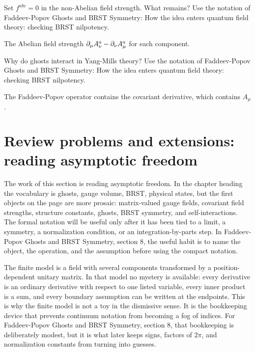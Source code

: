 \begin{exercise}
Set \(f^{abc}=0\) in the non-Abelian field strength.  What remains?  Use the notation of Faddeev-Popov Ghosts and BRST Symmetry: How the idea enters quantum field theory: checking BRST nilpotency.
\begin{answer}
The Abelian field strength \(\partial_\mu A_\nu^a-\partial_\nu A_\mu^a\) for each component.
\end{answer}
\end{exercise}

\begin{exercise}
Why do ghosts interact in Yang-Mills theory?  Use the notation of Faddeev-Popov Ghosts and BRST Symmetry: How the idea enters quantum field theory: checking BRST nilpotency.
\begin{answer}
The Faddeev-Popov operator contains the covariant derivative, which contains \(A_\mu\).
\end{answer}
\end{exercise}



\section{Review problems and extensions: reading asymptotic freedom}

The work of this section is reading asymptotic freedom.  In the chapter heading the vocabulary is ghosts, gauge volume, BRST, physical states, but the first objects on the page are more prosaic: matrix-valued gauge fields, covariant field strengths, structure constants, ghosts, BRST symmetry, and self-interactions.  The formal notation will be useful only after it has been tied to a limit, a symmetry, a normalization condition, or an integration-by-parts step.  In Faddeev-Popov Ghosts and BRST Symmetry, section 8, the useful habit is to name the object, the operation, and the assumption before using the compact notation.

The finite model is a field with several components transformed by a position-dependent unitary matrix.  In that model no mystery is available: every derivative is an ordinary derivative with respect to one listed variable, every inner product is a sum, and every boundary assumption can be written at the endpoints.  This is why the finite model is not a toy in the dismissive sense.  It is the bookkeeping device that prevents continuum notation from becoming a fog of indices.  For Faddeev-Popov Ghosts and BRST Symmetry, section 8, that bookkeeping is deliberately modest, but it is what later keeps signs, factors of \(2\pi\), and normalization constants from turning into guesses.

